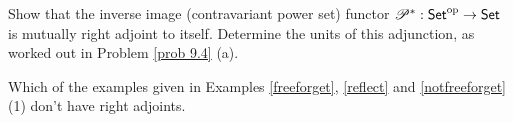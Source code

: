 \vspace*{0.1in}

\begin{problem}\label{prob 9.5}
Show that the inverse image (contravariant power set) functor $\mathscr{P}^*: \mathsf{Set}^{\text{op}} \to \mathsf{Set}$ is mutually right adjoint to itself. Determine the units of this adjunction, as worked out in Problem \ref{prob 9.4} (a).
\end{problem}

\vspace*{0.1in}

\begin{problem}\label{prob 9.6}
Which of the examples given in Examples \ref{freeforget}, \ref{reflect} and \ref{notfreeforget} (1) don't have right adjoints.
\end{problem}